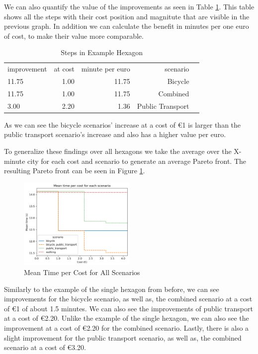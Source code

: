 We can also quantify the value of the improvements as seen in Table \ref{tab:differences_in_example_hexagon}.
This table shows all the steps with their cost position and magnitute that are visible in the previous graph.
In addition we can calculate the benefit in minutes per one euro of cost, to make their value more comparable.
\begin{table}
  \caption{Steps in Example Hexagon}
  \label{tab:differences_in_example_hexagon}
  \begin{center}
    \begin{tabular}{lrrrl}
     improvement & at cost & minute per euro & scenario \\
     11.75 & 1.00 & 11.75 & Bicycle \\
     11.75 & 1.00 & 11.75 & Combined \\
     3.00 & 2.20 & 1.36 & Public Transport \\
    \end{tabular}
  \end{center}
\end{table}
As we can see the bicycle scenarios' increase at a cost of \euro{1} is larger than the public transport scenario's increase and also has a higher value per euro.

To generalize these findings over all hexagons we take the average over the X-minute city for each cost and scenario to generate an average Pareto front.
The resulting Pareto front can be seen in Figure \ref{fig:mean_time_per_cost}.

\begin{figure}
  \begin{center}
     \includegraphics[width=0.5\textwidth]{Figures/results/metric_cost/mean_time_per_cost}
  \end{center}
  \caption{Mean Time per Cost for All Scenarios}
  \label{fig:mean_time_per_cost}
\end{figure}

Similarly to the example of the single hexagon from before, we can see improvements for the bicycle scenario, as well as, the combined scenario at a cost of \euro{1} of about 1.5 minutes.
We can also see the improvements of public transport at a cost of \euro{2.20}.
Unlike the example of the single hexagon, we can also see the improvement at a cost of \euro{2.20} for the combined scenario.
Lastly, there is also a slight improvement for the public transport scenario, as well as, the combined scenario at a cost of \euro{3.20}.

